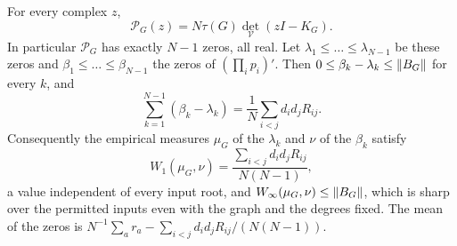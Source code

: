 \begin{theorem}\label{zer:thm:electrical}
For every complex $z$,
\begin{equation}\label{zer:eq:compression}
 \mathcal P_G(z)=N\tau(G)\det_{\mathcal V}(zI-K_G).
\end{equation}
In particular $\mathcal P_G$ has exactly $N-1$ zeros, all real. Let
$\lambda_1\le\dots\le\lambda_{N-1}$ be these zeros and $\beta_1\le\dots\le\beta_{N-1}$ the zeros of
$(\prod_ip_i)'$. Then $0\le\beta_k-\lambda_k\le\lVert B_G\rVert$ for every $k$, and
\begin{equation}\label{zer:eq:resistance}
 \sum_{k=1}^{N-1}(\beta_k-\lambda_k)=\frac1N\sum_{i<j}d_id_jR_{ij}.
\end{equation}
Consequently the empirical measures $\mu_G$ of the $\lambda_k$ and $\nu$ of the $\beta_k$ satisfy
\[
 W_1(\mu_G,\nu)=\frac{\sum_{i<j}d_id_jR_{ij}}{N(N-1)},
\]
a value independent of every input root, and $W_\infty(\mu_G,\nu)\le\lVert B_G\rVert$, which is sharp over
the permitted inputs even with the graph and the degrees fixed. The mean of the zeros is
$N^{-1}\sum_ar_a-\sum_{i<j}d_id_jR_{ij}/(N(N-1))$.
\end{theorem}

